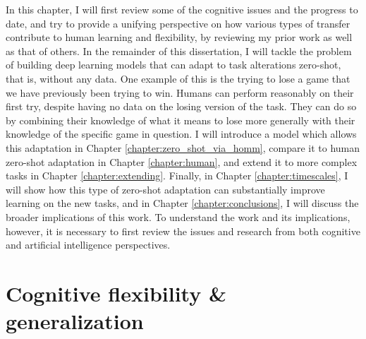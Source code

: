 In this chapter, I will first review some of the cognitive issues and the progress to date, and try to provide a unifying perspective on how various types of transfer contribute to human learning and flexibility, by reviewing my prior work as well as that of others. In the remainder of this dissertation, I will tackle the problem of building deep learning models that can adapt to task alterations zero-shot, that is, without any data. One example of this is the trying to lose a game that we have previously been trying to win. Humans can perform reasonably on their first try, despite having no data on the losing version of the task. They can do so by combining their knowledge of what it means to lose more generally with their knowledge of the specific game in question. I will introduce a model which allows this adaptation in Chapter \ref{chapter:zero_shot_via_homm}, compare it to human zero-shot adaptation in Chapter \ref{chapter:human}, and extend it to more complex tasks in Chapter \ref{chapter:extending}. Finally, in Chapter \ref{chapter:timescales}, I will show how this type of zero-shot adaptation can substantially improve learning on the new tasks, and in Chapter \ref{chapter:conclusions}, I will discuss the broader implications of this work. To understand the work and its implications, however, it is necessary to first review the issues and research from both cognitive and artificial intelligence perspectives. \par 

\section{Cognitive flexibility \& generalization}

